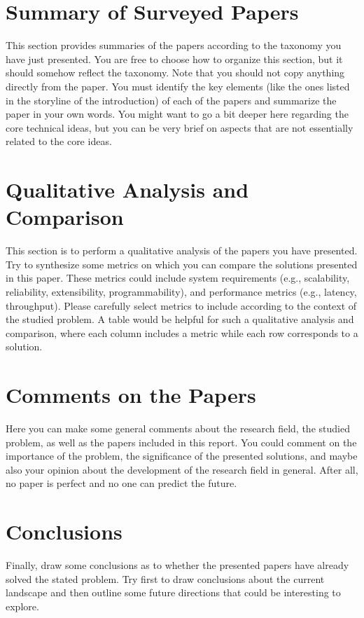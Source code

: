 \documentclass[report]{../upb-cn}
\begin{document}
\section{Summary of Surveyed Papers}
\label{sec:papers}

This section provides summaries of the papers according to the taxonomy you have just presented. You are free to choose how to organize this section, but it should somehow reflect the taxonomy. Note that you should not copy anything directly from the paper. You must identify the key elements (like the ones listed in the storyline of the introduction) of each of the papers and summarize the paper in your own words. You might want to go a bit deeper here regarding the core technical ideas, but you can be very brief on aspects that are not essentially related to the core ideas.

\section{Qualitative Analysis and Comparison}
\label{sec:analysis}

This section is to perform a qualitative analysis of the papers you have presented. Try to synthesize some metrics on which you can compare the solutions presented in this paper. These metrics could include system requirements (e.g., scalability, reliability, extensibility, programmability), and performance metrics (e.g., latency, throughput). Please carefully select metrics to include according to the context of the studied problem. A table would be helpful for such a qualitative analysis and comparison, where each column includes a metric while each row corresponds to a solution.

\section{Comments on the Papers}
\label{sec:comments}

Here you can make some general comments about the research field, the studied problem, as well as the papers included in this report. You could comment on the importance of the problem, the significance of the presented solutions, and maybe also your opinion about the development of the research field in general. After all, no paper is perfect and no one can predict the future. 

\section{Conclusions}
\label{sec:conclusions}

Finally, draw some conclusions as to whether the presented papers have already solved the stated problem. Try first to draw conclusions about the current landscape and then outline some future directions that could be interesting to explore. 

\printbibliography

\newpage


\end{document}
